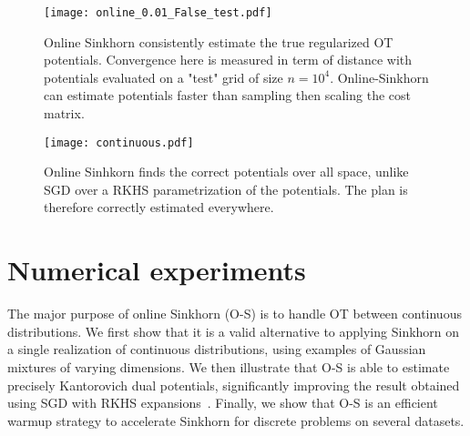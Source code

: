 \begin{figure}[t]
    \centering
    \texttt{[image: online\_0.01\_False\_test.pdf]}
    \caption{Online Sinkhorn consistently estimate the true regularized OT potentials. Convergence here is measured in term of distance with potentials evaluated on a "test" grid of size $n=10^4$. Online-Sinkhorn can estimate potentials faster than sampling then scaling the cost matrix.}
    \label{fig:convergence}
\end{figure}

\begin{figure}[t]
    \centering
    \texttt{[image: continuous.pdf]}
    \caption{Online Sinhkorn finds the correct potentials over all space, unlike SGD over a RKHS parametrization of the potentials. The plan is therefore correctly estimated everywhere.}
    \label{fig:potentials}
\end{figure}

\section{Numerical experiments}\label{sec:exps}



The major purpose of online Sinkhorn (O-S) is to handle OT between continuous
distributions.  We first show that it is a valid alternative to applying Sinkhorn
on a single realization of continuous distributions, using examples of Gaussian mixtures of varying dimensions.
%
We then illustrate that O-S is able to estimate precisely
Kantorovich dual potentials, significantly improving the result obtained using SGD with RKHS
expansions~\citep{2016-genevay-nips}.
%
Finally, we show that O-S is an efficient warmup strategy to accelerate Sinkhorn for discrete problems on several datasets.


